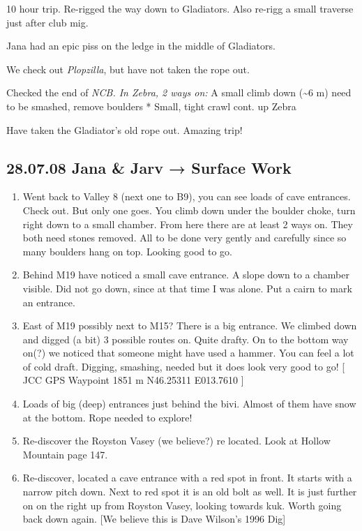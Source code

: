 10 hour trip. Re-rigged the way down to Gladiators. Also re-rigg a small
traverse just after club mig.

Jana had an epic piss on the ledge in the middle of Gladiators.

We check out \emph{Plopzilla}, but have not taken the rope out.

Checked the end of \emph{NCB. In Zebra, 2 ways on: } A small climb down
(\textasciitilde{}6 m) need to be smashed, remove boulders * Small,
tight crawl cont. up Zebra

Have taken the Gladiator's old rope out. Amazing trip! 

\hypertarget{jana-jarv-surface-work}{%
\subsection{28.07.08 Jana \& Jarv → Surface
Work}\label{jana-jarv-surface-work}}

\begin{enumerate}
\def\labelenumi{\arabic{enumi})}
\item
  Went back to Valley 8 (next one to B9), you can see loads of cave
  entrances. Check out. But only one goes. You climb down under the
  boulder choke, turn right down to a small chamber. From here there are
  at least 2 ways on. They both need stones removed. All to be done very
  gently and carefully since so many boulders hang on top. Looking good
  to go.
\item
  Behind M19 have noticed a small cave entrance. A slope down to a
  chamber visible. Did not go down, since at that time I was alone. Put
  a cairn to mark an entrance.
\item
  East of M19 possibly next to M15? There is a big entrance. We climbed
  down and digged (a bit) 3 possible routes on. Quite drafty. On to the
  bottom way on(?) we noticed that someone might have used a hammer. You
  can feel a lot of cold draft. Digging, smashing, needed but it does
  look very good to go! {[} JCC GPS Waypoint 1851 m N46.25311 E013.7610
  {]}
\item
  Loads of big (deep) entrances just behind the bivi. Almost of them
  have snow at the bottom. Rope needed to explore!
\item
  Re-discover the Royston Vasey (we believe?) re located. Look at Hollow
  Mountain page 147.
\item
  Re-discover, located a cave entrance with a red spot in front. It
  starts with a narrow pitch down. Next to red spot it is an old bolt as
  well. It is just further on on the right up from Royston Vasey,
  looking towards kuk. Worth going back down again. {[}We believe this
  is Dave Wilson's 1996 Dig{]}
\end{enumerate}

